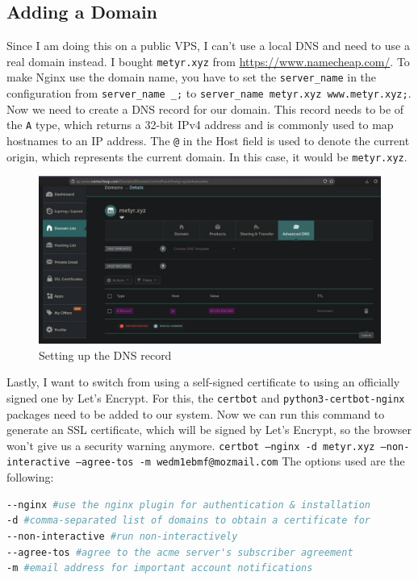 \documentclass[a4paper]{article}
\newcommand{\abc}{\hfill \break}
\begin{document}
\subsection{Adding a Domain}
Since I am doing this on a public VPS, I can't use a local DNS and need to use a real domain instead. I bought \texttt{metyr.xyz} from \url{https://www.namecheap.com/}.
To make Nginx use the domain name, you have to set the \texttt{server\_name} in the configuration from \texttt{server\_name \_;} to \texttt{server\_name metyr.xyz www.metyr.xyz;}.\abc
Now we need to create a DNS record for our domain.\abc
This record needs to be of the \texttt{A} type, which returns a 32-bit IPv4 address and is commonly used to map hostnames to an IP address. \cite{dns-record-types}\abc
The \texttt{@} in the Host field is used to denote the current origin, which represents the current domain. In this case, it would be \texttt{metyr.xyz}. \cite{rfc}
\begin{figure}[!htbp]
	\includegraphics[scale=0.3]{images/dnsentry.png}
	\centering
	\caption{Setting up the DNS record}
\end{figure}\abc\newpage
Lastly, I want to switch from using a self-signed certificate to using an officially signed one by Let's Encrypt. For this, the \texttt{certbot} and \texttt{python3-certbot-nginx} packages need to be added to our system.
Now we can run this command to generate an SSL certificate, which will be signed by Let's Encrypt, so the browser won't give us a security warning anymore.\abc
\texttt{certbot --nginx -d metyr.xyz --non-interactive --agree-tos -m wedm1ebmf@mozmail.com}\abc
The options used are the following:\cite{certbot-options}
\begin{lstlisting}[language=bash]
--nginx #use the nginx plugin for authentication & installation
-d #comma-separated list of domains to obtain a certificate for
--non-interactive #run non-interactively
--agree-tos #agree to the acme server's subscriber agreement
-m #email address for important account notifications
\end{lstlisting}
\end{document}
